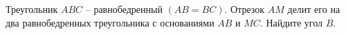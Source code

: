 \begin{ex}
	\begin{condition}
		Треугольник \( ABC \) – равнобедренный \( (AB = BC)\). Отрезок \( AM  \) делит его на два равнобедренных треугольника с	основаниями \( AB  \) и \( MC \). Найдите угол \( B \).
	\end{condition}
\end{ex}